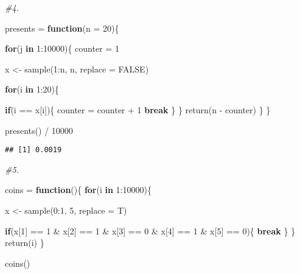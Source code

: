 \documentclass[
]{article}
\newenvironment{Shaded}{\begin{snugshade}}{\end{snugshade}}
\newcommand{\AttributeTok}[1]{\textcolor[rgb]{0.77,0.63,0.00}{#1}}
\newcommand{\CommentTok}[1]{\textcolor[rgb]{0.56,0.35,0.01}{\textit{#1}}}
\newcommand{\ConstantTok}[1]{\textcolor[rgb]{0.00,0.00,0.00}{#1}}
\newcommand{\ControlFlowTok}[1]{\textcolor[rgb]{0.13,0.29,0.53}{\textbf{#1}}}
\newcommand{\DecValTok}[1]{\textcolor[rgb]{0.00,0.00,0.81}{#1}}
\newcommand{\FunctionTok}[1]{\textcolor[rgb]{0.00,0.00,0.00}{#1}}
\newcommand{\NormalTok}[1]{#1}
\newcommand{\OtherTok}[1]{\textcolor[rgb]{0.56,0.35,0.01}{#1}}
\newcommand{\SpecialCharTok}[1]{\textcolor[rgb]{0.00,0.00,0.00}{#1}}
\begin{document}
\begin{Shaded}
\begin{Highlighting}[]
\CommentTok{\#4.}

\NormalTok{presents }\OtherTok{=} \ControlFlowTok{function}\NormalTok{(}\AttributeTok{n =} \DecValTok{20}\NormalTok{)\{}
  
  \ControlFlowTok{for}\NormalTok{(j }\ControlFlowTok{in} \DecValTok{1}\SpecialCharTok{:}\DecValTok{10000}\NormalTok{)\{}
\NormalTok{      counter }\OtherTok{=} \DecValTok{1}
  
\NormalTok{       x }\OtherTok{\textless{}{-}} \FunctionTok{sample}\NormalTok{(}\DecValTok{1}\SpecialCharTok{:}\NormalTok{n, n, }\AttributeTok{replace =} \ConstantTok{FALSE}\NormalTok{)}
  
      \ControlFlowTok{for}\NormalTok{(i }\ControlFlowTok{in} \DecValTok{1}\SpecialCharTok{:}\DecValTok{20}\NormalTok{)\{}
    
      \ControlFlowTok{if}\NormalTok{(i }\SpecialCharTok{==}\NormalTok{ x[i])\{}
\NormalTok{        counter }\OtherTok{=}\NormalTok{ counter }\SpecialCharTok{+} \DecValTok{1}
        \ControlFlowTok{break}
\NormalTok{        \}}
\NormalTok{      \}}
      \FunctionTok{return}\NormalTok{(n }\SpecialCharTok{{-}}\NormalTok{ counter)}
\NormalTok{  \}}
\NormalTok{\}}

\FunctionTok{presents}\NormalTok{() }\SpecialCharTok{/} \DecValTok{10000}
\end{Highlighting}
\end{Shaded}

\begin{verbatim}
## [1] 0.0019
\end{verbatim}

\begin{Shaded}
\begin{Highlighting}[]
\CommentTok{\#5.}

\NormalTok{coins }\OtherTok{=} \ControlFlowTok{function}\NormalTok{()\{}
  \ControlFlowTok{for}\NormalTok{(i }\ControlFlowTok{in} \DecValTok{1}\SpecialCharTok{:}\DecValTok{10000}\NormalTok{)\{}
    
\NormalTok{    x }\OtherTok{\textless{}{-}} \FunctionTok{sample}\NormalTok{(}\DecValTok{0}\SpecialCharTok{:}\DecValTok{1}\NormalTok{, }\DecValTok{5}\NormalTok{, }\AttributeTok{replace =}\NormalTok{ T)}
    
    \ControlFlowTok{if}\NormalTok{(x[}\DecValTok{1}\NormalTok{] }\SpecialCharTok{==} \DecValTok{1} \SpecialCharTok{\&}\NormalTok{ x[}\DecValTok{2}\NormalTok{] }\SpecialCharTok{==} \DecValTok{1} \SpecialCharTok{\&}\NormalTok{ x[}\DecValTok{3}\NormalTok{] }\SpecialCharTok{==} \DecValTok{0} \SpecialCharTok{\&}\NormalTok{ x[}\DecValTok{4}\NormalTok{] }\SpecialCharTok{==} \DecValTok{1} \SpecialCharTok{\&}\NormalTok{ x[}\DecValTok{5}\NormalTok{] }\SpecialCharTok{==} \DecValTok{0}\NormalTok{)\{}
      \ControlFlowTok{break}
\NormalTok{    \}}
\NormalTok{  \}}
  \FunctionTok{return}\NormalTok{(i)}
\NormalTok{\}}

\FunctionTok{coins}\NormalTok{()}
\end{Highlighting}
\end{Shaded}
\end{document}
